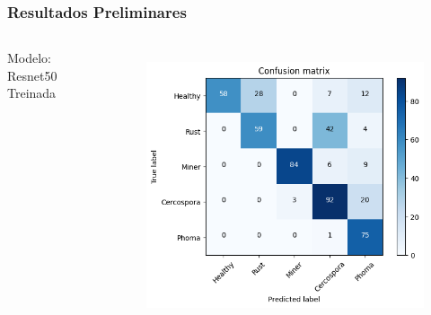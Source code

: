 \documentclass[aspectratio=169]{beamer}
\begin{document}
\begin{frame}
    \frametitle{Resultados Preliminares}

    \centering


    \begin{columns}



        \centering
        \tiny Modelo: Resnet50 Treinada
        \begin{figure}
            \centering
            \includegraphics[scale=0.39]{img/resnet50result1.png}
            \label{fig:enter-label}
        \end{figure}
        \centering




\end{columns}
\end{frame}
\end{document}
